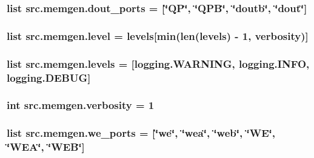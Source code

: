 \hypertarget{namespacesrc_1_1memgen_aeae6c4bd2a1a967c91b883005ed80186}{
\subsubsection[{dout\-\_\-ports}]{\setlength{\rightskip}{0pt plus 5cm}list src.\-memgen.\-dout\-\_\-ports = \mbox{[}\char`\"{}Q\-P\char`\"{}, \char`\"{}Q\-P\-B\char`\"{}, \char`\"{}doutb\char`\"{}, \char`\"{}dout\char`\"{}\mbox{]}}}\label{namespacesrc_1_1memgen_aeae6c4bd2a1a967c91b883005ed80186}
\hypertarget{namespacesrc_1_1memgen_ac7ae8c0e35d863fc05d43394c8f61b9f}{
\subsubsection[{level}]{\setlength{\rightskip}{0pt plus 5cm}list src.\-memgen.\-level = {\bf levels}\mbox{[}min(len({\bf levels}) -\/ 1, {\bf verbosity})\mbox{]}}}\label{namespacesrc_1_1memgen_ac7ae8c0e35d863fc05d43394c8f61b9f}
\hypertarget{namespacesrc_1_1memgen_a5d7d5179f4134ac1e8b6471f1cf27f87}{
\subsubsection[{levels}]{\setlength{\rightskip}{0pt plus 5cm}list src.\-memgen.\-levels = \mbox{[}logging.\-W\-A\-R\-N\-I\-N\-G, logging.\-I\-N\-F\-O, logging.\-D\-E\-B\-U\-G\mbox{]}}}\label{namespacesrc_1_1memgen_a5d7d5179f4134ac1e8b6471f1cf27f87}
\hypertarget{namespacesrc_1_1memgen_a7cff048d4b6c8e136dc541a7c4c20cb9}{
\subsubsection[{verbosity}]{\setlength{\rightskip}{0pt plus 5cm}int src.\-memgen.\-verbosity = 1}}\label{namespacesrc_1_1memgen_a7cff048d4b6c8e136dc541a7c4c20cb9}
\hypertarget{namespacesrc_1_1memgen_a3abad88dc3de0d051d3d1f4c8380e886}{
\subsubsection[{we\-\_\-ports}]{\setlength{\rightskip}{0pt plus 5cm}list src.\-memgen.\-we\-\_\-ports = \mbox{[}\char`\"{}we\char`\"{}, \char`\"{}wea\char`\"{}, \char`\"{}web\char`\"{}, \char`\"{}W\-E\char`\"{}, \char`\"{}W\-E\-A\char`\"{}, \char`\"{}W\-E\-B\char`\"{}\mbox{]}}}\label{namespacesrc_1_1memgen_a3abad88dc3de0d051d3d1f4c8380e886}
